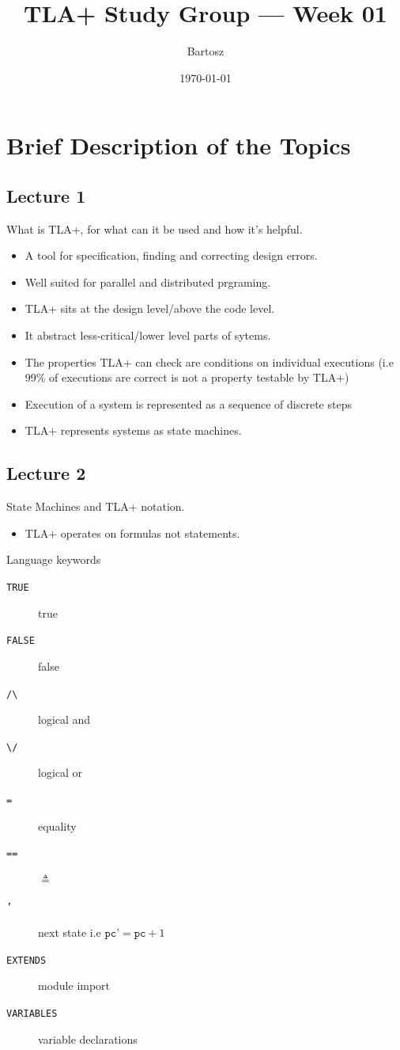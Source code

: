 \documentclass[11pt]{article}
\title{TLA+ Study Group — Week 01}
\author{Bartosz}
\date{\today}
\begin{document}
\maketitle

\section*{Brief Description of the Topics}

\subsection*{Lecture 1}

What is TLA+, for what can it be used and how it's helpful.

\begin{itemize}
  \item A tool for specification, finding and correcting design errors.
  \item Well suited for parallel and distributed prgraming.
  \item TLA+ sits at the design level/above the code level.
  \item It abstract less-critical/lower level parts of sytems.
  \item The properties TLA+ can check are conditions on individual executions
  (i.e 99\% of executions are correct is not a property testable by TLA+)
  \item Execution of a system is represented as a sequence of discrete steps
  \item TLA+ represents systems as state machines.
\end{itemize}


\subsection*{Lecture 2}

State Machines and TLA+ notation.

\begin{itemize}
  \item { TLA+ operates on formulas not statements. }
\end{itemize}

Language keywords

\begin{description}
  \item[\texttt{TRUE}] { true }
  \item[\texttt{FALSE}] { false }
  \item[\texttt{/\textbackslash}] { logical and }
  \item[\texttt{\textbackslash/}] { logical or }
  \item[\texttt{=}] { equality }
  \item[\texttt{==}] { $\triangleq$  }
  \item[\texttt{'}] { next state i.e $\texttt{pc'} = \texttt{pc} + 1$   }
  \item[\texttt{EXTENDS}] { module import }
  \item[\texttt{VARIABLES}] { variable declarations }
\end{description}
\end{document}
